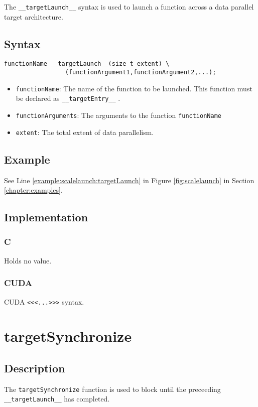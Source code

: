 The \verb+__targetLaunch__+ syntax is used to launch a function across a data parallel target architecture.

\subsection{Syntax}
\begin{verbatim}
functionName __targetLaunch__(size_t extent) \
                 (functionArgument1,functionArgument2,...);
\end{verbatim}

\begin{itemize}
\item \verb+functionName+: The name of the function to be launched. This function must be declared as \verb+__targetEntry__+ .
\item \verb+functionArguments+: The arguments to the function \verb+functionName+  
\item \verb+extent+: The total extent of data parallelism.
\end{itemize}


\subsection{Example}
See Line \ref{example:scalelaunch:targetLaunch} in Figure \ref{fig:scalelaunch} in Section \ref{chapter:examples}.

\subsection{Implementation}
\subsubsection{C}
Holds no value.
\subsubsection{CUDA}
CUDA \verb+<<<...>>>+ syntax.

\newpage
\section{targetSynchronize}

\subsection{Description}

The \verb+targetSynchronize+ function is used to block until the preceeding \verb+__targetLaunch__+ has completed.

